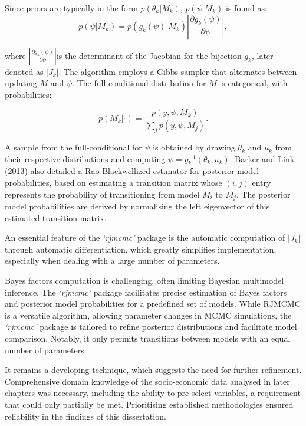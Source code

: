 \documentclass[
  11pt,
]{article}
\begin{document}
Since priors are typically in the form \(p(\theta_k|M_k)\),
\(p(\psi|M_k)\) is found as: \begin{equation}
p(\psi|M_k) = p(g_k(\psi)|M_k) \left| \frac{\partial g_k(\psi)}{\partial \psi} \right|,
\end{equation}

where \(\left| \frac{\partial g_k(\psi)}{\partial \psi} \right|\)is the
determinant of the Jacobian for the bijection \(g_k\), later denoted as
\(|J_k|\). The algorithm employs a Gibbs sampler that alternates between
updating \(M\) and \(\psi\). The full-conditional distribution for \(M\)
is categorical, with probabilities:

\begin{equation}
p(M_k|\cdot) = \frac{p(y,\psi,M_k)}{\sum_j p(y,\psi,M_j)}.
\end{equation}

A sample from the full-conditional for \(\psi\) is obtained by drawing
\(\theta_k\) and \(u_k\) from their respective distributions and
computing \(\psi=g_k^{-1}(\theta_k,u_k)\). Barker and Link
(\protect\hyperlink{ref-Barker2013}{2013}) also detailed a
Rao-Blackwellized estimator for posterior model probabilities, based on
estimating a transition matrix whose \((i, j)\) entry represents the
probability of transitioning from model \(M_i\) to \(M_j\). The
posterior model probabilities are derived by normalising the left
eigenvector of this estimated transition matrix.

An essential feature of the \emph{`rjmcmc'} package is the automatic
computation of \(|J_k|\) through automatic differentiation, which
greatly simplifies implementation, especially when dealing with a large
number of parameters.

Bayes factors computation is challenging, often limiting Bayesian
multimodel inference. The \emph{`rjmcmc'} package facilitates precise
estimation of Bayes factors and posterior model probabilities for a
predefined set of models. While RJMCMC is a versatile algorithm,
allowing parameter changes in MCMC simulations, the \emph{`rjmcmc'}
package is tailored to refine posterior distributions and facilitate
model comparison. Notably, it only permits transitions between models
with an equal number of parameters.

It remains a developing technique, which suggests the need for further
refinement. Comprehensive domain knowledge of the socio-economic data
analysed in later chapters was necessary, including the ability to
pre-select variables, a requirement that could only partially be met.
Prioritising established methodologies ensured reliability in the
findings of this dissertation.
\end{document}
